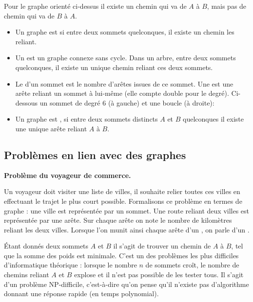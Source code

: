 \documentclass[11pt,class=report,crop=false]{standalone}
\begin{document}
Pour le graphe orienté ci-dessus il existe un chemin qui va de $A$ à $B$, mais pas de chemin qui va de $B$ à $A$.


\begin{itemize}
	\item Un graphe est  si entre deux sommets quelconques, il existe un chemin les reliant.
	\item Un  est un graphe connexe sans cycle. Dans un arbre, entre deux sommets quelconques, il existe un unique chemin reliant ces deux sommets.
	\item Le  d'un sommet est le nombre d'arêtes issues de ce sommet.
	Une  est une arête reliant un sommet à lui-même (elle compte double pour le degré). Ci-dessous un sommet de degré $6$ (à gauche) et une boucle (à droite):
	\item Un graphe est , si entre deux sommets distincts $A$ et $B$ quelconques il existe une unique arête reliant $A$ à $B$.
		
\end{itemize}



\subsection{Problèmes en lien avec des graphes}


\textbf{Problème du voyageur de commerce.}

Un voyageur doit visiter une liste de villes, il souhaite relier toutes ces villes en effectuant le trajet le plus court possible. 
Formalisons ce problème en termes de graphe : une ville est représentée par un sommet.
Une route reliant deux villes est représentée par une arête. Sur chaque arête on note le nombre de kilomètres reliant les deux villes. 
Lorsque l'on munit ainsi chaque arête d'un , on parle d'un .

\'Etant donnés deux sommets $A$ et $B$ il s'agit de trouver un chemin de $A$ à $B$, tel que la somme des poids est minimale.
C'est un des problèmes les plus difficiles d'informatique théorique : lorsque le nombre $n$ de sommets croît, le nombre de chemins reliant $A$ et $B$ explose et il n'est pas possible de les tester tous. Il s'agit d'un problème NP-difficile, c'est-à-dire qu'on pense qu'il n'existe pas d'algorithme donnant une réponse rapide (en temps polynomial).
\end{document}
